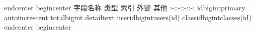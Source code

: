 {}\markdownRendererBackslash{}end\markdownRendererLeftBrace{}center\markdownRendererRightBrace{}\markdownRendererInterblockSeparator
{}\markdownRendererInterblockSeparator
{}\markdownRendererBackslash{}begin\markdownRendererLeftBrace{}center\markdownRendererRightBrace{}\markdownRendererInterblockSeparator
{}\markdownRendererPipe{} 字段名称 \markdownRendererPipe{} 类型 \markdownRendererPipe{} 索引 \markdownRendererPipe{} 外键 \markdownRendererPipe{} 其他 \markdownRendererPipe{} \markdownRendererPipe{}:-:\markdownRendererPipe{}:-:\markdownRendererPipe{}:-:\markdownRendererPipe{}:-:\markdownRendererPipe{} \markdownRendererPipe{}id\markdownRendererPipe{}bigint\markdownRendererPipe{}primary\markdownRendererPipe{}\markdownRendererPipe{} auto\markdownRendererBackslash{}\markdownRendererUnderscore{}increscent\markdownRendererPipe{} \markdownRendererPipe{}total\markdownRendererPipe{}bigint\markdownRendererPipe{}\markdownRendererPipe{}\markdownRendererPipe{}\markdownRendererPipe{} \markdownRendererPipe{}detail\markdownRendererPipe{}text\markdownRendererPipe{}\markdownRendererPipe{}\markdownRendererPipe{}\markdownRendererPipe{} \markdownRendererPipe{}user\markdownRendererBackslash{}\markdownRendererUnderscore{}id\markdownRendererPipe{}bigint\markdownRendererPipe{}\markdownRendererPipe{}users(id)\markdownRendererPipe{}\markdownRendererPipe{} \markdownRendererPipe{}class\markdownRendererBackslash{}\markdownRendererUnderscore{}id\markdownRendererPipe{}bigint\markdownRendererPipe{}\markdownRendererPipe{}classes(id)\markdownRendererPipe{}\markdownRendererPipe{}\markdownRendererInterblockSeparator
{}\markdownRendererBackslash{}end\markdownRendererLeftBrace{}center\markdownRendererRightBrace{}\markdownRendererInterblockSeparator
{}\markdownRendererInterblockSeparator
{}\markdownRendererBackslash{}begin\markdownRendererLeftBrace{}center\markdownRendererRightBrace{}\markdownRendererInterblockSeparator
